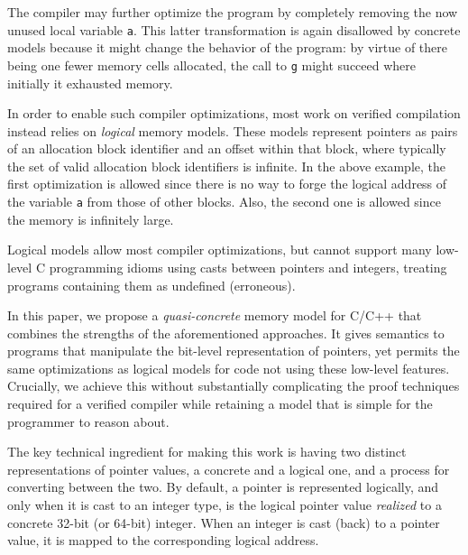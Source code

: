 The compiler may further optimize the program by completely removing
the now unused local variable \texttt{a}. This latter transformation is again
disallowed by concrete models because it might change the behavior of
the program:
by virtue of there being one fewer memory cells allocated, the call to \texttt{g}
might succeed where initially it exhausted memory.



In order to enable such compiler optimizations, most work on verified
compilation instead relies on \emph{logical} memory models.  These
models represent pointers as pairs of an allocation block identifier
and an offset within that block, where typically the set of valid
allocation block identifiers is infinite.  In the above
example, the first optimization is allowed since there is no way to
forge the logical address of the variable \texttt{a} from those of
other blocks. Also, the second one is allowed since the
memory is infinitely large.

Logical models allow most compiler optimizations, but cannot
support many low-level C programming idioms using casts
between pointers and integers, treating programs containing them
as undefined (\ie erroneous).


In this paper, we propose a \emph{quasi-concrete} memory model for C/C++ that
combines the strengths of the aforementioned approaches. It gives semantics to
programs that manipulate the bit-level representation of pointers, yet permits
the same optimizations as logical models for code not using these low-level
features. Crucially, we achieve this without substantially complicating the
proof techniques required for a verified compiler while retaining a model that is
simple for the programmer to reason about.

The key technical ingredient for making this work is having two
distinct representations of pointer values, a concrete and a logical one,
and a process for converting between the two.
By default, a pointer is represented logically, and only when it is
cast to an integer type, is the logical pointer value
\emph{realized} to a concrete 32-bit (or 64-bit) integer.
When an integer is cast (back) to a pointer value, 
it is mapped to the corresponding logical address.

